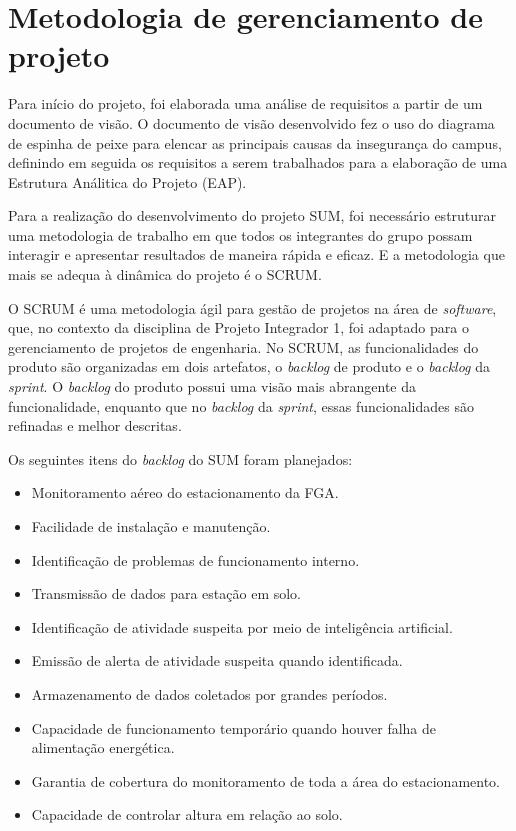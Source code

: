 \section{Metodologia de gerenciamento de projeto} %

  Para início do projeto, foi elaborada uma análise de requisitos a partir de um documento de visão. O documento de visão desenvolvido fez o uso do diagrama de espinha de peixe para elencar as principais causas da insegurança do campus, definindo em seguida os requisitos a serem trabalhados para a elaboração de uma Estrutura Análitica do Projeto (EAP).

  Para a realização do desenvolvimento do projeto SUM, foi necessário estruturar uma metodologia de trabalho em que todos os integrantes do grupo possam interagir e apresentar resultados de maneira rápida e eficaz. E a metodologia que mais se adequa à dinâmica do projeto é o SCRUM.

  O SCRUM é uma metodologia ágil para gestão de projetos na área de \emph{software}, que, no contexto da disciplina de Projeto Integrador 1, foi adaptado para o gerenciamento de projetos de engenharia.
  No SCRUM, as funcionalidades do produto são organizadas em dois artefatos, o \emph{backlog} de produto e o \emph{backlog} da \emph{sprint}. O \emph{backlog} do produto possui uma visão mais abrangente da funcionalidade, enquanto que no \emph{backlog} da \emph{sprint}, essas funcionalidades são refinadas e melhor descritas.

  Os seguintes itens do \emph{backlog} do SUM foram planejados:

  \begin{itemize}
    \item Monitoramento aéreo do estacionamento da FGA.
    \item Facilidade de instalação e manutenção.
    \item Identificação de problemas de funcionamento interno.
    \item Transmissão de dados para estação em solo.
    \item Identificação de atividade suspeita por meio de inteligência artificial.
    \item Emissão de alerta de atividade suspeita quando identificada.
    \item Armazenamento de dados coletados por grandes períodos.
    \item Capacidade de funcionamento temporário quando houver falha de alimentação  energética.
    \item Garantia de cobertura do monitoramento de toda a área do estacionamento.
    \item Capacidade de controlar altura em relação ao solo.
\end{itemize}

